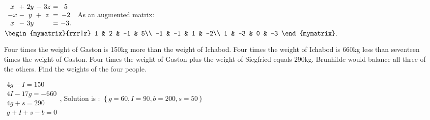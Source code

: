 \begin{enumialphparenastyle}
\begin{ex}
  \begin{sol}
    $
    \begin{array}{c@{~}c@{~}c@{~}c@{~}c@{~}c@{~}c}
      x &+& 2y &-& 3z &=& 5\\
      -x &-& y &+& z &=& -2\\
      x &-& 3y && &=& -3.\\
    \end{array}
    $
    As an augmented matrix:
    $
    \begin{mymatrix}{rrr|r}
      1 & 2 & -1 & 5\\
      -1 & -1 & 1 & -2\\
      1 & -3 & 0 & -3
    \end{mymatrix}.
    $
  \end{sol}
\end{ex}


\begin{ex}
Four times the weight of Gaston is 150kg more than the weight of
Ichabod. Four times the weight of Ichabod is 660kg less than seventeen
times the weight of Gaston. Four times the weight of Gaston plus the weight
of Siegfried equals 290kg. Brunhilde would balance all three of the
others. Find the weights of the four people.
\begin{sol}
$\begin{array}{c}
4g-I=150 \\
4I-17g=-660 \\
4g+s=290 \\
g+I+s-b=0
\end{array}
$, Solution is : $\left\{ g=60,I=90,b=200,s=50\right\} $
\end{sol}
\end{ex}

\end{enumialphparenastyle}

